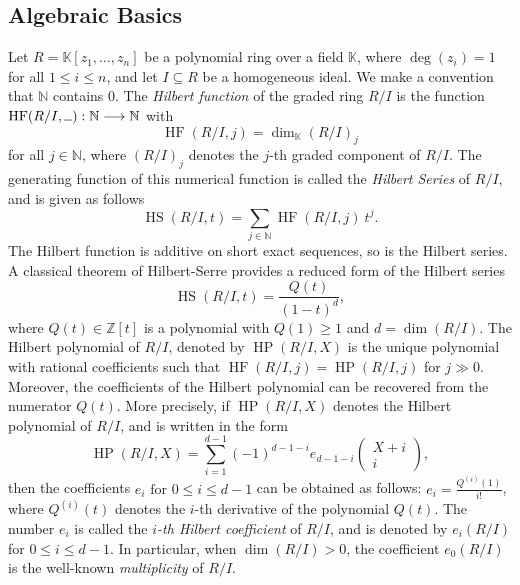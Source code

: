 \documentclass[12pt,reqno]{amsart}
\newcommand \hs{\operatorname{HS}}
\newcommand \hf{\operatorname{HF}}
\newcommand \hp{\operatorname{HP}}
\newcommand \K{\mathbb{K}}
\theoremstyle{plain}
\theoremstyle{definition}
\begin{document}
\subsection{Algebraic Basics}
Let \(R=\mathbb{K}[z_1,\ldots,z_n]\) be a polynomial ring over a field \(\mathbb{K}\), where \(\deg(z_i)=1\) for all \(1\le i\le n\), and let \(I\subseteq R\) be a homogeneous ideal. We make a convention that $\mathbb {N} $ contains $0$. The \emph{Hilbert function} of the graded ring $R/I$ is the function $\hf(R/I, \rule{0.2cm}{0.15mm}):\mathbb{N}\longrightarrow \mathbb{N}$ with 
    \[
    \hf(R/I, j)=\dim_{\K}(R/I)_j
    \]
    for all $j\in \mathbb N$, where $(R/I)_j$ denotes the $j$-th graded component of $R/I$. The generating function of this numerical function is called the \emph{Hilbert Series} of $R/I$, and is given as follows
    \[
    \hs(R/I,t)=\sum_{j\in \mathbb{N}}\hf(R/I,j)\ t^j.
    \]
    The Hilbert function is additive on short exact sequences, so is the Hilbert series. A classical theorem of Hilbert-Serre provides a reduced form of the Hilbert series
    \[
    \hs(R/I,t)=\frac{Q(t)}{(1-t)^d},
    \]
    where $Q(t)\in \mathbb{Z}[t]$ is a polynomial with $Q(1)\geq 1$ and $d=\dim(R/I)$. The Hilbert polynomial of $R/I$, denoted by $\hp(R/I, X)$ is the unique polynomial with rational coefficients such that $\hf(R/I,j)=\hp(R/I, j)$ for $j\gg 0$.
    Moreover, the coefficients of the Hilbert polynomial can be recovered from the numerator $Q(t)$. More precisely, if $\hp(R/I, X)$ denotes the Hilbert polynomial of $R/I$, and is written in the form
    \[
    \hp(R/I, X)= \sum_{i=1}^{d-1}(-1)^{d-1-i}e_{d-1-i} \left( \begin{array}{c} X+i \\ i \end{array} \right),
    \]
    then the coefficients $e_i \text{ for }0\leq i\leq d-1$ can be obtained as  follows: $e_i=\frac{Q^{(i)}(1)}{i!}$, where $Q^{(i)}(t)$ denotes the $i$-th derivative of the polynomial $Q(t)$. The number $e_i$ is called the 
    \emph{$i$-th Hilbert coefficient} of $R/I$, and is denoted by $e_i(R/I)$ for $0\leq i\leq d-1$. In particular, when $\dim(R/I)>0$, the coefficient $e_0(R/I)$ is the well-known \emph{multiplicity} of $R/I$. 
\end{document}
